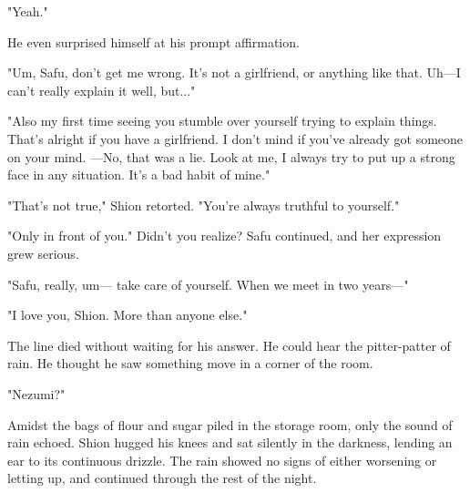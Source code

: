 "Yeah."

He even surprised himself at his prompt affirmation.

"Um, Safu, don't get me wrong. It's not a girlfriend, or anything like
that. Uh---I can't really explain it well, but..."

"Also my first time seeing you stumble over yourself trying to explain
things. That's alright if you have a girlfriend. I don't mind if you've
already got someone on your mind. ---No, that was a lie. Look at me, I
always try to put up a strong face in any situation. It's a bad habit of
mine."

"That's not true," Shion retorted. "You're always truthful to yourself."

"Only in front of you." Didn't you realize? Safu continued, and her
expression grew serious.

"Safu, really, um--- take care of yourself. When we meet in two years---"

"I love you, Shion. More than anyone else."

The line died without waiting for his answer. He could hear the
pitter-patter of rain. He thought he saw something move in a corner of
the room.

"Nezumi?"

Amidst the bags of flour and sugar piled in the storage room, only the
sound of rain echoed. Shion hugged his knees and sat silently in the
darkness, lending an ear to its continuous drizzle. The rain showed no
signs of either worsening or letting up, and continued through the rest
of the night.
